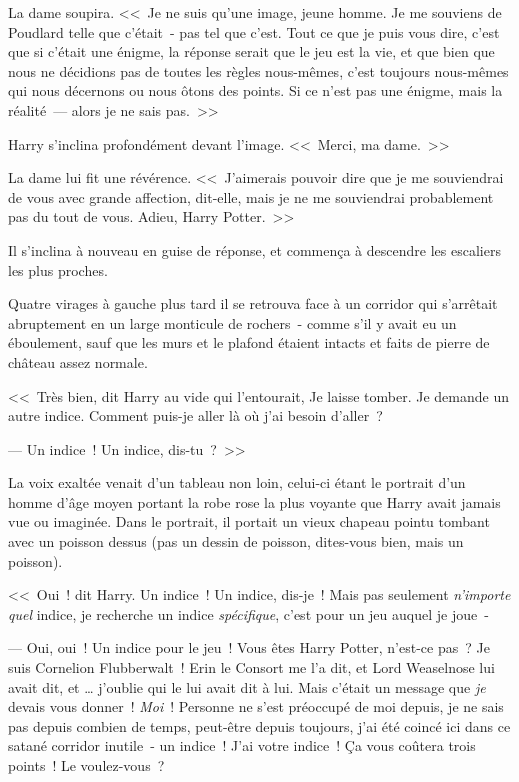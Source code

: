La dame soupira. <<~Je ne suis qu'une image, jeune homme. Je me souviens de Poudlard telle que c'était~- pas tel que c'est. Tout ce que je puis vous dire, c'est que si c'était une énigme, la réponse serait que le jeu est la vie, et que bien que nous ne décidions pas de toutes les règles nous-mêmes, c'est toujours nous-mêmes qui nous décernons ou nous ôtons des points. Si ce n'est pas une énigme, mais la réalité~— alors je ne sais pas.~>>

Harry s'inclina profondément devant l'image. <<~Merci, ma dame.~>>

La dame lui fit une révérence. <<~J'aimerais pouvoir dire que je me souviendrai de vous avec grande affection, dit-elle, mais je ne me souviendrai probablement pas du tout de vous. Adieu, Harry Potter.~>>

Il s'inclina à nouveau en guise de réponse, et commença à descendre les escaliers les plus proches.

Quatre virages à gauche plus tard il se retrouva face à un corridor qui s'arrêtait abruptement en un large monticule de rochers~- comme s'il y avait eu un éboulement, sauf que les murs et le plafond étaient intacts et faits de pierre de château assez normale.

<<~Très bien, dit Harry au vide qui l'entourait, Je laisse tomber. Je demande un autre indice. Comment puis-je aller là où j'ai besoin d'aller~?

--- Un indice~! Un indice, dis-tu~?~>>

La voix exaltée venait d'un tableau non loin, celui-ci étant le portrait d'un homme d'âge moyen portant la robe rose la plus voyante que Harry avait jamais vue ou imaginée. Dans le portrait, il portait un vieux chapeau pointu tombant avec un poisson dessus (pas un dessin de poisson, dites-vous bien, mais un poisson).

<<~Oui~! dit Harry. Un indice~! Un indice, dis-je~! Mais pas seulement \emph{n'importe quel} indice, je recherche un indice \emph{spécifique}, c'est pour un jeu auquel je joue~-

--- Oui, oui~! Un indice pour le jeu~! Vous êtes Harry Potter, n'est-ce pas~? Je suis Cornelion Flubberwalt~! Erin le Consort me l'a dit, et Lord Weaselnose lui avait dit, et … j'oublie qui le lui avait dit à lui. Mais c'était un message que \emph{je} devais vous donner~! \emph{Moi}~! Personne ne s'est préoccupé de moi depuis, je ne sais pas depuis combien de temps, peut-être depuis toujours, j'ai été coincé ici dans ce satané corridor inutile~- un indice~! J'ai votre indice~! Ça vous coûtera trois points~! Le voulez-vous~?


